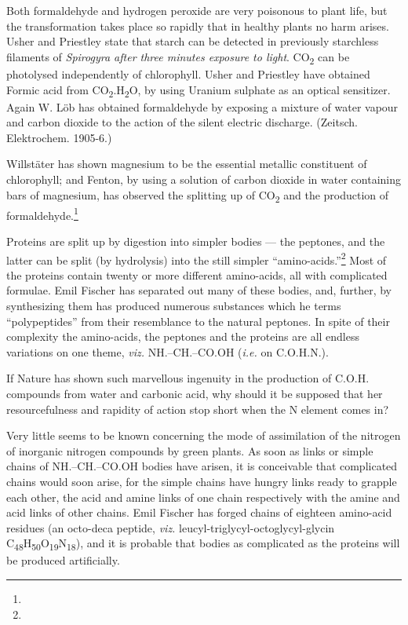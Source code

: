 \documentclass[a4paper, 12pt, oneside]{article}
\begin{document}
Both formaldehyde and hydrogen peroxide are very poisonous to plant life, but the transformation takes place so rapidly that in healthy plants no harm arises. Usher and Priestley state that starch can be detected in previously starchless filaments of \emph{Spirogyra after three minutes exposure to light}. CO\textsubscript{2} can be photolysed independently of chlorophyll. Usher and Priestley have obtained Formic acid from CO\textsubscript{2}.H\textsubscript{2}O, by using Uranium sulphate as an optical sensitizer. Again W. Löb has obtained formaldehyde by exposing a mixture of water vapour and carbon dioxide to the action of the silent electric discharge. (Zeitsch. Elektrochem. 1905-6.)

Willstäter has shown magnesium to be the essential metallic constituent of chlorophyll; and Fenton, by using a solution of carbon dioxide in water containing bars of magnesium, has observed the splitting up of CO\textsubscript{2} and the production of formaldehyde.\footnote{}

Proteins are split up by digestion into simpler bodies --- the peptones, and the latter can be split (by hydrolysis) into the still simpler ``amino-acids.''\footnote{} Most of the proteins contain twenty or more different amino-acids, all with complicated formulae. Emil Fischer has separated out many of these bodies, and, further, by synthesizing them has produced numerous substances which he terms ``polypeptides'' from their resemblance to the natural peptones. In spite of their complexity the amino-acids, the peptones and the proteins are all endless variations on one theme, \emph{viz.} NH.--CH.--CO.OH (\emph{i.e.} on C.O.H.N.).

If Nature has shown such marvellous ingenuity in the production of C.O.H. compounds from water and carbonic acid, why should it be supposed that her resourcefulness and rapidity of action stop short when the N element comes in?

Very little seems to be known concerning the mode of assimilation of the nitrogen of inorganic nitrogen compounds by green plants. As soon as links or simple chains of NH.--CH.--CO.OH bodies have arisen, it is conceivable that complicated chains would soon arise, for the simple chains have hungry links ready to grapple each other, the acid and amine links of one chain respectively with the amine and acid links of other chains. Emil Fischer has forged chains of eighteen amino-acid residues (an octo-deca peptide, \emph{viz.} leucyl-triglycyl-octoglycyl-glycin C\textsubscript{48}H\textsubscript{50}O\textsubscript{19}N\textsubscript{18}), and it is probable that bodies as complicated as the proteins will be produced artificially.
\end{document}
